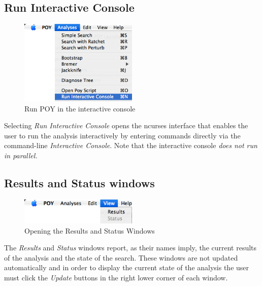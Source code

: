 \subsection{Run Interactive Console}
\begin{figure}[htpb]
    \begin{center}
        \includegraphics[width=0.5\textwidth]{figures/RunInteractive_Menu.jpg}
    \end{center}
    \caption{Run POY in the interactive console}
    \label{fig:open_poy_script}
\end{figure}
Selecting \emph{Run Interactive Console} opens the ncurses interface
that enables the user to run the analysis interactively by entering
\poy commands directly via the command-line \emph{Interactive
Console}. Note that the interactive console \emph{does not run in parallel.}

\subsection{Results and Status windows}

\begin{figure}[htpb]
    \begin{center}
        \includegraphics[width=0.5\textwidth]{figures/View_Menu.jpg}
    \end{center}
    \caption{Opening the Results and Status Windows}
    \label{fig:results_and_status_windows}
\end{figure}
The \emph{Results} and \emph{Status} windows report, as their names
imply, the current results of the analysis and the state of the
search. These windows are not updated automatically and in order
to display the current state of the analysis the user must click
the \emph{Update} buttons in the right lower corner of each window.

